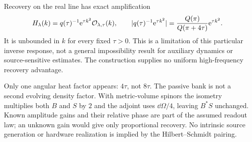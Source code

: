 Recovery on the real line has exact amplification
\begin{equation}\label{eq:inverse}
 H_\lambda(k)=q(\tau)^{-1}\mathrm e^{\tau k^2}\mathcal O_{\lambda,\tau}(k),
 \qquad |q(\tau)^{-1}\mathrm e^{\tau k^2}|
 =\frac{Q(\pi)}{Q(\pi+4\tau)}\mathrm e^{\tau k^2}.
\end{equation}
It is unbounded in $k$ for every fixed $\tau>0$. This is a limitation
of this particular inverse response, not a general impossibility result
for auxiliary dynamics or source-sensitive estimates. The construction
supplies no uniform high-frequency recovery advantage.

Only one angular heat factor appears: $4\tau$, not $8\tau$. The
passive bank is not a second evolving density factor. With metric-volume
spinors the isometry multiplies both $B$ and $S$ by $2$ and the adjoint
uses $\dd\Omega/4$, leaving $B^*S$ unchanged. Known amplitude gains
and their relative phase are part of the assumed readout law; an
unknown gain would give only proportional recovery. No intrinsic source
generation or hardware realization is implied by the Hilbert--Schmidt
pairing.
